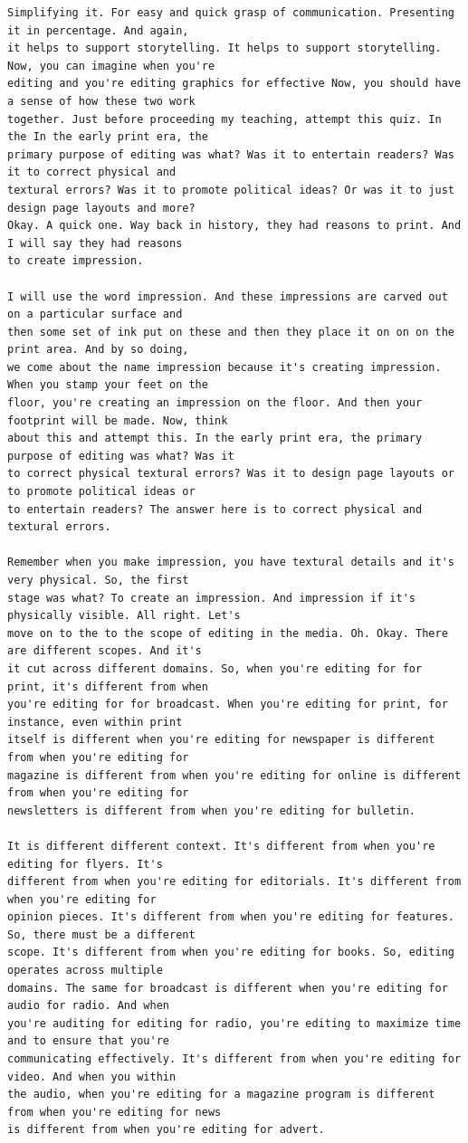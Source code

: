 {\begin{Verbatim}
Simplifying it. For easy and quick grasp of communication. Presenting it in percentage. And again,
it helps to support storytelling. It helps to support storytelling. Now, you can imagine when you're
editing and you're editing graphics for effective Now, you should have a sense of how these two work
together. Just before proceeding my teaching, attempt this quiz. In the In the early print era, the
primary purpose of editing was what? Was it to entertain readers? Was it to correct physical and
textural errors? Was it to promote political ideas? Or was it to just design page layouts and more?
Okay. A quick one. Way back in history, they had reasons to print. And I will say they had reasons
to create impression.

I will use the word impression. And these impressions are carved out on a particular surface and
then some set of ink put on these and then they place it on on on the print area. And by so doing,
we come about the name impression because it's creating impression. When you stamp your feet on the
floor, you're creating an impression on the floor. And then your footprint will be made. Now, think
about this and attempt this. In the early print era, the primary purpose of editing was what? Was it
to correct physical textural errors? Was it to design page layouts or to promote political ideas or
to entertain readers? The answer here is to correct physical and textural errors.

Remember when you make impression, you have textural details and it's very physical. So, the first
stage was what? To create an impression. And impression if it's physically visible. All right. Let's
move on to the to the scope of editing in the media. Oh. Okay. There are different scopes. And it's
it cut across different domains. So, when you're editing for for print, it's different from when
you're editing for for broadcast. When you're editing for print, for instance, even within print
itself is different when you're editing for newspaper is different from when you're editing for
magazine is different from when you're editing for online is different from when you're editing for
newsletters is different from when you're editing for bulletin.

It is different different context. It's different from when you're editing for flyers. It's
different from when you're editing for editorials. It's different from when you're editing for
opinion pieces. It's different from when you're editing for features. So, there must be a different
scope. It's different from when you're editing for books. So, editing operates across multiple
domains. The same for broadcast is different when you're editing for audio for radio. And when
you're auditing for editing for radio, you're editing to maximize time and to ensure that you're
communicating effectively. It's different from when you're editing for video. And when you within
the audio, when you're editing for a magazine program is different from when you're editing for news
is different from when you're editing for advert.


\end{Verbatim}}
